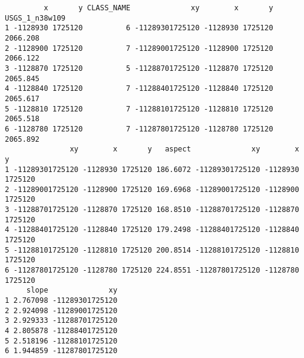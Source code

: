 \documentclass[
  letterpaper,
]{book}
\begin{document}
\begin{verbatim}
         x       y CLASS_NAME              xy        x       y USGS_1_n38w109
1 -1128930 1725120          6 -11289301725120 -1128930 1725120       2066.208
2 -1128900 1725120          7 -11289001725120 -1128900 1725120       2066.122
3 -1128870 1725120          5 -11288701725120 -1128870 1725120       2065.845
4 -1128840 1725120          7 -11288401725120 -1128840 1725120       2065.617
5 -1128810 1725120          7 -11288101725120 -1128810 1725120       2065.518
6 -1128780 1725120          7 -11287801725120 -1128780 1725120       2065.892
               xy        x       y   aspect              xy        x       y
1 -11289301725120 -1128930 1725120 186.6072 -11289301725120 -1128930 1725120
2 -11289001725120 -1128900 1725120 169.6968 -11289001725120 -1128900 1725120
3 -11288701725120 -1128870 1725120 168.8510 -11288701725120 -1128870 1725120
4 -11288401725120 -1128840 1725120 179.2498 -11288401725120 -1128840 1725120
5 -11288101725120 -1128810 1725120 200.8514 -11288101725120 -1128810 1725120
6 -11287801725120 -1128780 1725120 224.8551 -11287801725120 -1128780 1725120
     slope              xy
1 2.767098 -11289301725120
2 2.924098 -11289001725120
3 2.929333 -11288701725120
4 2.805878 -11288401725120
5 2.518196 -11288101725120
6 1.944859 -11287801725120
\end{verbatim}
\end{document}

